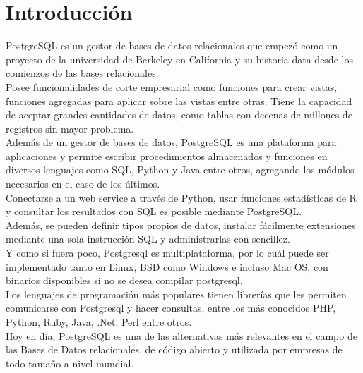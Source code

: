 \chapter{Introducción}

PostgreSQL es un gestor de bases de datos relacionales que empezó como un proyecto de la universidad de Berkeley en California y su historia data desde los comienzos de las bases relacionales.\\

Posee funcionalidades de corte empresarial como funciones para crear vistas, funciones agregadas para aplicar sobre las vistas entre otras. Tiene la capacidad de aceptar grandes cantidades de datos, como tablas con decenas de millones de registros sin mayor problema.\\

Además de un gestor de bases de datos, PostgreSQL es una plataforma para aplicaciones y permite escribir procedimientos almacenados y funciones en diversos lenguajes como SQL, Python y Java entre otros, agregando los módulos necesarios en el caso de los últimos.\\

Conectarse a un web service a través de Python, usar funciones estadísticas de R y consultar los resultados con SQL es posible mediante PostgreSQL.\\

Además, se pueden definir tipos propios de datos, instalar fácilmente extensiones mediante una sola instrucción SQL y administrarlas con sencillez.\\

Y como si fuera poco, Postgresql es multiplataforma, por lo cuál puede ser implementado tanto en Linux, BSD como Windows e incluso Mac OS, con binarios disponibles si no se desea compilar postgresql.\\

Los lenguajes de programación más populares tienen librerías que les permiten comunicarse con Postgresql y hacer consultas, entre los más conocidos PHP, Python, Ruby, Java, .Net, Perl entre otros.\\

Hoy en día, PostgreSQL es una de las alternativas más relevantes en el campo de las Bases de Datos relacionales, de código abierto y utilizada por empresas de todo tamaño a nivel mundial.\\